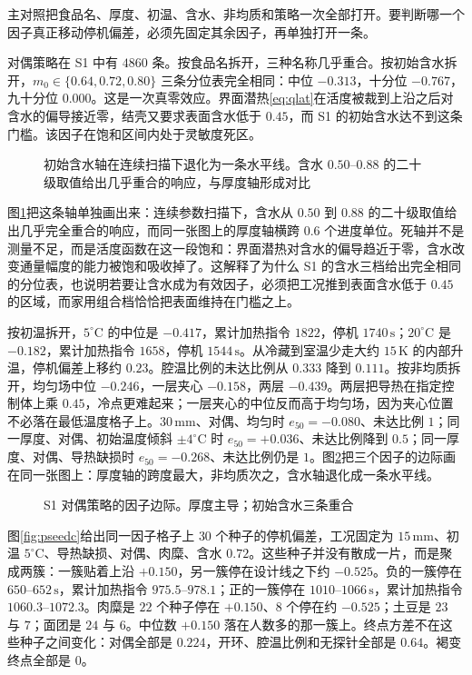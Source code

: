 主对照把食品名、厚度、初温、含水、非均质和策略一次全部打开。要判断哪一个因子真正移动停机偏差，必须先固定其余因子，再单独打开一条。

对偶策略在 S1 中有 \(4860\) 条。按食品名拆开，三种名称几乎重合。按初始含水拆开，\(m_0\in\{0.64,0.72,0.80\}\) 三条分位表完全相同：中位 \(-0.313\)，十分位 \(-0.767\)，九十分位 \(0.000\)。这是一次真零效应。界面潜热\eqref{eq:qlat}在活度被裁到上沿之后对含水的偏导接近零，结壳又要求表面含水低于 \(0.45\)，而 S1 的初始含水达不到这条门槛。该因子在饱和区间内处于灵敏度死区。

\begin{figure}[htbp]
\centering
{}
\caption{初始含水轴在连续扫描下退化为一条水平线。含水 \(0.50\)--\(0.88\) 的二十级取值给出几乎重合的响应，与厚度轴形成对比}
\label{fig:moist}
\end{figure}

图\ref{fig:moist}{}把这条轴单独画出来：连续参数扫描下，含水从 \(0.50\) 到 \(0.88\) 的二十级取值给出几乎完全重合的响应，而同一张图上的厚度轴横跨 \(0.6\) 个进度单位。死轴并不是测量不足，而是活度函数在这一段饱和：界面潜热对含水的偏导趋近于零，含水改变通量幅度的能力被饱和吸收掉了。这解释了为什么 S1 的含水三档给出完全相同的分位表，也说明若要让含水成为有效因子，必须把工况推到表面含水低于 \(0.45\) 的区域，而家用组合档恰恰把表面维持在门槛之上。

按初温拆开，\(5^\circ\mathrm{C}\) 的中位是 \(-0.417\)，累计加热指令 \(1822\)，停机 \(1740\,\mathrm{s}\)；\(20^\circ\mathrm{C}\) 是 \(-0.182\)，累计加热指令 \(1658\)，停机 \(1544\,\mathrm{s}\)。从冷藏到室温少走大约 \(15\,\mathrm{K}\) 的内部升温，停机偏差上移约 \(0.23\)。腔温比例的未达比例从 \(0.333\) 降到 \(0.111\)。按非均质拆开，均匀场中位 \(-0.246\)，一层夹心 \(-0.158\)，两层 \(-0.439\)。两层把导热在指定控制体上乘 \(0.45\)，冷点更难起来；一层夹心的中位反而高于均匀场，因为夹心位置不必落在最低温度格子上。\(30\,\mathrm{mm}\)、对偶、均匀时 \(e_{50}=-0.080\)、未达比例 \(1\)；同一厚度、对偶、初始温度倾斜 \(\pm 4^\circ\mathrm{C}\) 时 \(e_{50}=+0.036\)、未达比例降到 \(0.5\)；同一厚度、对偶、导热缺损时 \(e_{50}=-0.268\)、未达比例仍是 \(1\)。图\ref{fig:s1fac}{}把三个因子的边际画在同一张图上：厚度轴的跨度最大，非均质次之，含水轴退化成一条水平线。

\begin{figure}[t]
\centering
{}
\caption{S1 对偶策略的因子边际。厚度主导；初始含水三条重合}
\label{fig:s1fac}
\end{figure}

图\ref{fig:pseedc}{}给出同一因子格子上 \(30\) 个种子的停机偏差，工况固定为 \(15\,\mathrm{mm}\)、初温 \(5^\circ\mathrm{C}\)、导热缺损、对偶、肉糜、含水 \(0.72\)。这些种子并没有散成一片，而是聚成两簇：一簇贴着上沿 \(+0.150\)，另一簇停在设计线之下约 \(-0.525\)。负的一簇停在 \(650\)--\(652\,\mathrm{s}\)，累计加热指令 \(975.5\)--\(978.1\)；正的一簇停在 \(1010\)--\(1066\,\mathrm{s}\)，累计加热指令 \(1060.3\)--\(1072.3\)。肉糜是 \(22\) 个种子停在 \(+0.150\)、\(8\) 个停在约 \(-0.525\)；土豆是 \(23\) 与 \(7\)；面团是 \(24\) 与 \(6\)。中位数 \(+0.150\) 落在人数多的那一簇上。终点方差不在这些种子之间变化：对偶全部是 \(0.224\)，开环、腔温比例和无探针全部是 \(0.64\)。褐变终点全部是 \(0\)。

